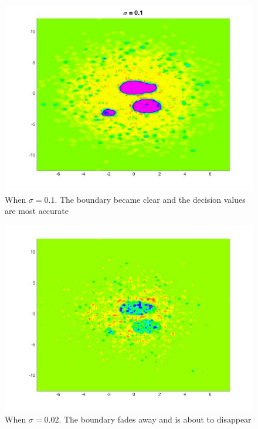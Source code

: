 \documentclass[twoside]{article}
\theoremstyle{definition}
\theoremstyle{definition}
\theoremstyle{remark}
\begin{document}
\begin{figure}[H]
\centering
\includegraphics[width=120mm]{sigma_01.jpg}
\caption{ When $\sigma = 0.1$. The boundary became clear and the decision values are most accurate\label{problem2Pic4}}
\end{figure}

\begin{figure}[H]
\centering
\includegraphics[width=120mm]{sigma_002.jpg}
\caption{ When $\sigma = 0.02$. The boundary fades away and is about to disappear\label{problem2Pic5}}
\end{figure}
\end{document}
